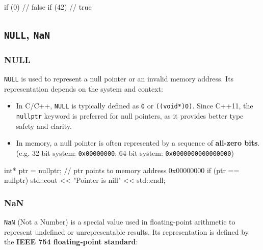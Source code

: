 \vspace{-0.5em}

\begin{codeblock}[language=C++, numbers=none]
if (0)    // false
if (42)   // true
\end{codeblock}

\subsection{\texttt{NULL}, \texttt{NaN}}

\subsubsection{NULL}

\texttt{NULL} is used to represent a null pointer or an invalid memory address. Its representation depends on the system and context:

\begin{itemize}
    \item In C/C++, \texttt{NULL} is typically defined as \texttt{0} or \texttt{((void*)0)}. Since C++11, the \texttt{nullptr} keyword is preferred for null pointers, as it provides better type safety and clarity.
    \item In memory, a null pointer is often represented by a sequence of \textbf{all-zero bits}. (e.g. 32-bit system: \texttt{0x00000000}; 64-bit system: \texttt{0x0000000000000000})
\end{itemize}


\begin{exampleblock}
    \begin{codeblock}[language=C++]
int* ptr = nullptr; // ptr points to memory address 0x00000000
if (ptr == nullptr) {
    std::cout << "Pointer is nill" << std::endl;
}
    \end{codeblock}
\end{exampleblock}

\subsubsection{NaN}

\texttt{NaN} (Not a Number) is a special value used in floating-point arithmetic to represent undefined or unrepresentable results. Its representation is defined by the \textbf{IEEE 754 floating-point standard}:


